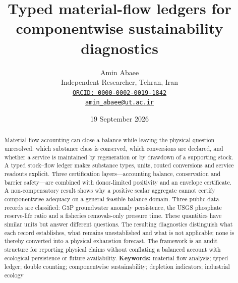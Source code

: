 \documentclass[11pt]{article}
\title{Typed material-flow ledgers for componentwise sustainability diagnostics}
\author{Amin Abaee\\[0.25em]
{\small Independent Researcher, Tehran, Iran}\\[0.25em]
{\small\href{https://orcid.org/0000-0002-0019-1842}{\nolinkurl{ORCID: 0000-0002-0019-1842}}}\\[0.25em]
{\small\href{mailto:amin_abaee@ut.ac.ir}{\nolinkurl{amin_abaee@ut.ac.ir}}}}
\date{19 September 2026}
\begin{document}
\maketitle
\begin{abstract}
Material-flow accounting can close a balance while leaving the physical question unresolved: which substance class is conserved, which conversions are declared, and whether a service is maintained by regeneration or by drawdown of a supporting stock. A typed stock--flow ledger makes substance types, units, routed conversions and service readouts explicit. Three certification layers---accounting balance, conservation and barrier safety---are combined with donor-limited positivity and an envelope certificate. A non-compensatory result shows why a positive scalar aggregate cannot certify componentwise adequacy on a general feasible balance domain. Three public-data records are classified: G3P groundwater anomaly persistence, the USGS phosphate reserve-life ratio and a fisheries removals-only pressure time. These quantities have similar units but answer different questions. The resulting diagnostics distinguish what each record establishes, what remains unestablished and what is not applicable; none is thereby converted into a physical exhaustion forecast. The framework is an audit structure for reporting physical claims without conflating a balanced account with ecological persistence or future availability.
\textbf{Keywords:} material flow analysis; typed ledger; double counting; componentwise sustainability; depletion indicators; industrial ecology
\end{abstract}
\end{document}
